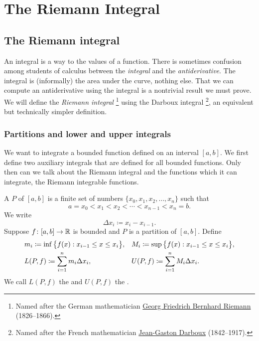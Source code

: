 \chapter{The Riemann Integral} \label{int:chapter}


\section{The Riemann integral}
\label{sec:rint}



An integral is a way to  the values of a function.
There is sometimes confusion among students of
calculus between the \emph{integral} and the \emph{antiderivative}.
The integral is (informally) the area under the curve, nothing else.
That we can compute an antiderivative using the integral is a nontrivial
result we must prove.  
We will define the \emph{Riemann integral}%
\footnote{Named after the German mathematician
\href{https://en.wikipedia.org/wiki/Riemann}{Georg Friedrich Bernhard Riemann}
(1826--1866).}
using the Darboux integral%
\footnote{Named after the French mathematician
\href{https://en.wikipedia.org/wiki/Darboux}{Jean-Gaston Darboux} (1842--1917).},
an equivalent but technically simpler definition.

\subsection{Partitions and lower and upper integrals}

We want to integrate a bounded function defined on an interval $[a,b]$.
We first define two auxiliary integrals that are defined for all
bounded functions.  Only then can we talk about the Riemann integral and
the functions which it can integrate, the Riemann integrable functions.

\begin{defn}
A \emph{} $P$ of $[a,b]$ is
a finite set of numbers $\{ x_0,x_1,x_2,\ldots,x_n \}$ such that
\begin{equation*}
a = x_0 < x_1 < x_2 < \cdots < x_{n-1} < x_n = b .
\end{equation*}
We write
\begin{equation*}
\Delta x_i \coloneqq x_i - x_{i-1} .
\end{equation*}
Suppose $f \colon [a,b] \to {\mathbb{R}}$ is bounded and $P$ is a partition of
$[a,b]$.
Define
\begin{align*}
& m_i \coloneqq \inf \, \bigl\{ f(x) : x_{i-1} \leq x \leq x_i \bigr\} , &
& M_i \coloneqq \sup \, \bigl\{ f(x) : x_{i-1} \leq x \leq x_i \bigr\} , \\
& L(P,f) \coloneqq
\sum_{i=1}^n m_i \Delta x_i , &
& U(P,f) \coloneqq
\sum_{i=1}^n M_i \Delta x_i .
\avoidbreak
\end{align*}
We call $L(P,f)$ the \emph{} and
$U(P,f)$ the \emph{}.
\end{defn}

